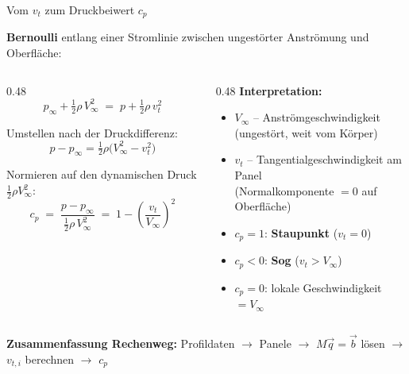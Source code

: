 \documentclass[aspectratio=169]{beamer}
\begin{document}
\begin{frame}{Vom $v_t$ zum Druckbeiwert $c_p$}
\footnotesize

\textbf{Bernoulli} entlang einer Stromlinie zwischen ungestörter Anströmung und Oberfläche:

\begin{columns}[T]
\begin{column}{0.48\textwidth}
\[
  p_\infty + \tfrac{1}{2}\rho\, V_\infty^2
  \;=\;
  p + \tfrac{1}{2}\rho\, v_t^2
\]

Umstellen nach der Druckdifferenz:
\[
  p - p_\infty = \tfrac{1}{2}\rho\bigl(V_\infty^2 - v_t^2\bigr)
\]

Normieren auf den dynamischen Druck $\tfrac{1}{2}\rho V_\infty^2$:
\[
  \boxed{c_p \;=\; \frac{p - p_\infty}{\tfrac{1}{2}\rho\,V_\infty^2}
  \;=\; 1 - \left(\frac{v_t}{V_\infty}\right)^{\!2}}
\]
\end{column}
\begin{column}{0.48\textwidth}
\textbf{Interpretation:}

\medskip
\begin{itemize}\setlength\itemsep{4pt}
  \item $V_\infty$ -- Anströmgeschwindigkeit\\
        (ungestört, weit vom Körper)
  \item $v_t$ -- Tangentialgeschwindigkeit am Panel\\
        (Normalkomponente $= 0$ auf Oberfläche)
  \item $c_p = 1$: \textbf{Staupunkt} ($v_t = 0$)
  \item $c_p < 0$: \textbf{Sog} ($v_t > V_\infty$)
  \item $c_p = 0$: lokale Geschwindigkeit $= V_\infty$
\end{itemize}
\end{column}
\end{columns}

\medskip
\textbf{Zusammenfassung Rechenweg:}\;
Profildaten $\to$ Panele $\to$ $M\vec{q}=\vec{b}$ lösen $\to$ $v_{t,i}$ berechnen $\to$ $c_p$

\end{frame}
\end{document}
